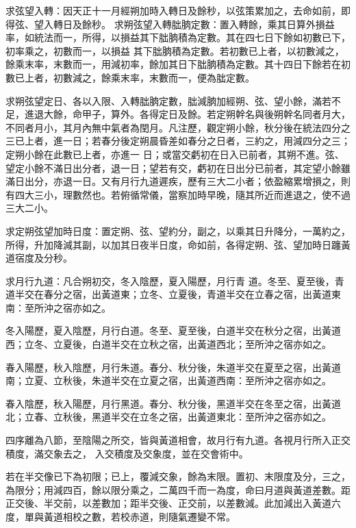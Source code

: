 \begin{pinyinscope}
 求弦望入轉：因天正十一月經朔加時入轉日及餘秒，以弦策累加之，去命如前，即得弦、望入轉日及餘秒。
 求朔弦望入轉朏朒定數：置入轉餘，乘其日算外損益率，如統法而一，所得，以損益其下朏朒積為定數。其在四七日下餘如初數已下，初率乘之，初數而一，以損益
 其下朏朒積為定數。若初數已上者，以初數減之，餘乘末率，末數而一，用減初率，餘加其日下朏朒積為定數。其十四日下餘若在初數已上者，初數減之，餘乘末率，末數而一，便為朏定數。



 求朔弦望定日、各以入限、入轉朏朒定數，朏減朒加經朔、弦、望小餘，滿若不足，進退大餘，命甲子，算外。各得定日及餘。若定朔幹名與後朔幹名同者月大，不同者月小，其月內無中氣者為閏月。凡注歷，觀定朔小餘，秋分後在統法四分之三已上者，進一日；若春分後定朔晨昏差如春分之日者，三約之，用減四分之三；定朔小餘在此數已上者，亦進一
 日；或當交虧初在日入已前者，其朔不進。弦、望定小餘不滿日出分者，退一日；望若有交，虧初在日出分已前者，其定望小餘雖滿日出分，亦退一日。又有月行九道遲疾，歷有三大二小者；依盈縮累增損之，則有四大三小，理數然也。若俯循常儀，當察加時早晚，隨其所近而進退之，使不過三大二小。



 求定朔弦望加時日度：置定朔、弦、望約分，副之，以乘其日升降分，一萬約之，所得，升加降減其副，以加其日夜半日度，命如前，各得定朔、弦、望加時日躔黃道宿度及分秒。



 求月行九道：凡合朔初交，冬入陰歷，夏入陽歷，月行青
 道。冬至、夏至後，青道半交在春分之宿，出黃道東；立冬、立夏後，青道半交在立春之宿，出黃道東南：至所沖之宿亦如之。



 冬入陽歷，夏入陰歷，月行白道。冬至、夏至後，白道半交在秋分之宿，出黃道西；立冬、立夏後，白道半交在立秋之宿，出黃道西北；至所沖之宿亦如之。



 春入陽歷，秋入陰歷，月行朱道。春分、秋分後，朱道半交在夏至之宿，出黃道南；立夏、立秋後，朱道半交在立夏之宿，出黃道西南：至所沖之宿亦如之。



 春入陰歷，秋入陽歷，月行黑道。春分、秋分後，黑道半交在冬至之宿，出黃道北；立春、立秋後，黑道半交在立冬之宿，出黃道東北：至所沖之宿亦如之。



 四序離為八節，至陰陽之所交，皆與黃道相會，故月行有九道。各視月行所入正交積度，滿交象去之，
 入交積度及交象度，並在交會術中。



 若在半交像已下為初限；已上，覆減交象，餘為末限。置初、末限度及分，三之，為限分；用減四百，餘以限分乘之，二萬四千而一為度，命曰月道與黃道差數。距正交後、半交前，以差數加；距半交後、正交前，以差數減。此加減出入黃道六度，單與黃道相校之數，若校赤道，則隨氣遷變不常。




\end{pinyinscope}
